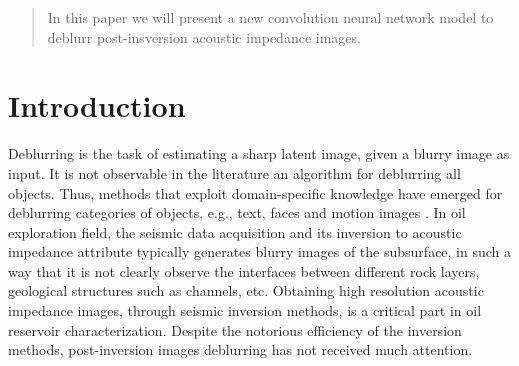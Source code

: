 \documentclass[conference,compsoc]{IEEEtran}
\begin{document}




\maketitle

\begin{abstract}
In this paper we will present a new convolution neural network
model to deblurr post-insversion acoustic impedance images.

\end{abstract}





%
\IEEEpeerreviewmaketitle

\section{Introduction}
Deblurring is the task of estimating a sharp latent image,
given a blurry image as input.
It is not observable in the literature
an algorithm for deblurring all objects. Thus, methods that exploit
domain-specific knowledge have emerged for deblurring
categories of objects, e.g., text, faces and motion images \cite{Grigorios2017}.
In oil exploration field, the seismic data acquisition and its
inversion to acoustic impedance attribute typically generates
blurry images of the subsurface, in such a way that it is not
clearly observe the interfaces between different rock layers,
geological structures such as channels, etc.
Obtaining high resolution acoustic impedance images, through seismic inversion methods,
is a critical part in oil reservoir characterization.
Despite the notorious efficiency of the inversion methods,
post-inversion images deblurring has not received much attention.
\end{document}
